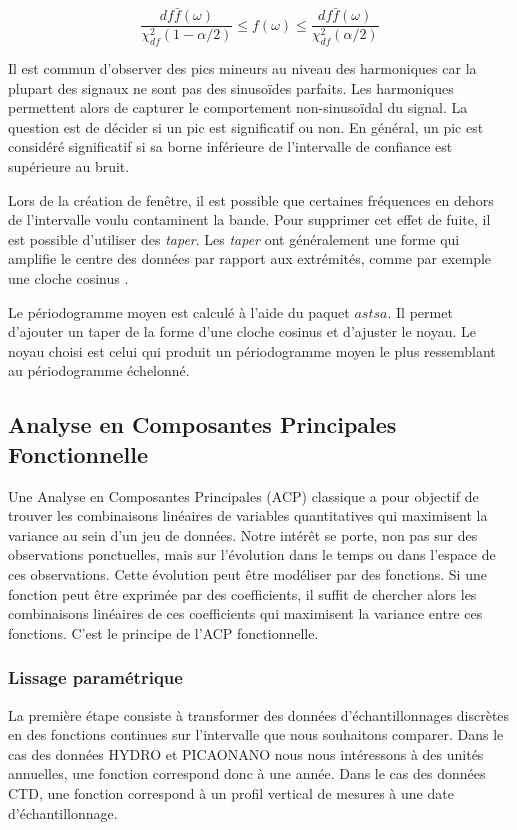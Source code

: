 \documentclass[12pt]{article}
\begin{document}
\[\frac{df\bar{f}(\omega)}{\chi_{df}^2(1-\alpha/2)}\leq f(\omega) \leq \frac{df\bar{f}(\omega)}{\chi_{df}^2(\alpha/2)}\] 

Il est commun d'observer des pics mineurs au niveau des harmoniques car la plupart des signaux ne sont pas des sinusoïdes parfaits. Les harmoniques permettent alors de capturer le comportement non-sinusoïdal du signal. La question est de décider si un pic est significatif ou non. En général, un pic est considéré significatif si sa borne inférieure de l’intervalle de confiance est supérieure au bruit. 

Lors de la création de fenêtre, il est possible que certaines fréquences en dehors de l'intervalle voulu contaminent la bande. Pour supprimer cet effet de fuite, il est possible d'utiliser des \textit{taper}. Les \textit{taper} ont généralement une forme qui amplifie le centre des données par rapport aux extrémités, comme par exemple une cloche cosinus \citep{Shumway2016}.

Le périodogramme moyen est calculé à l’aide du paquet $astsa$. Il permet d’ajouter un taper de la forme d’une cloche cosinus et d’ajuster le noyau. Le noyau choisi est celui qui produit un périodogramme moyen le plus ressemblant au périodogramme échelonné. 


\subsection{Analyse en Composantes Principales Fonctionnelle}

Une Analyse en Composantes Principales (ACP) classique a pour objectif de trouver les combinaisons linéaires de variables quantitatives qui maximisent la variance au sein d’un jeu de données. Notre intérêt se porte, non pas sur des observations ponctuelles, mais sur l’évolution dans le temps ou dans l’espace de ces observations. Cette évolution peut être modéliser par des fonctions. Si une fonction peut être exprimée par des coefficients, il suffit de chercher alors les combinaisons linéaires de ces coefficients qui maximisent la variance entre ces fonctions. C’est le principe de l’ACP fonctionnelle. 

\subsubsection{Lissage paramétrique}

La première étape consiste à transformer des données d’échantillonnages discrètes en des fonctions continues sur l’intervalle que nous souhaitons comparer. Dans le cas des données HYDRO et PICAONANO nous nous intéressons à des unités annuelles, une fonction correspond donc à une année. Dans le cas des données CTD, une fonction correspond à un profil vertical de mesures à une date d’échantillonnage.   
\end{document}
